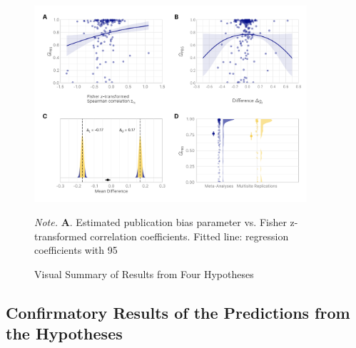 \documentclass[
  12pt,
]{scrartcl}
\begin{document}
\begin{figure}[H]
\caption{Visual Summary of Results from Four Hypotheses
\label{fig:hypotheses}}

\begin{center}
\includegraphics[width=0.9\textwidth,height=\textheight]{../figures/hypotheses_multipanel.png}
\end{center}

\begingroup
\scriptsize
\textit{Note.} \textbf{A}. Estimated publication bias parameter vs. Fisher z-transformed correlation coefficients. Fitted line: regression coefficients with 95%
\endgroup
\end{figure}

\subsection{Confirmatory Results of the Predictions from the
Hypotheses}\label{confirmatory-results-of-the-predictions-from-the-hypotheses}
\end{document}
